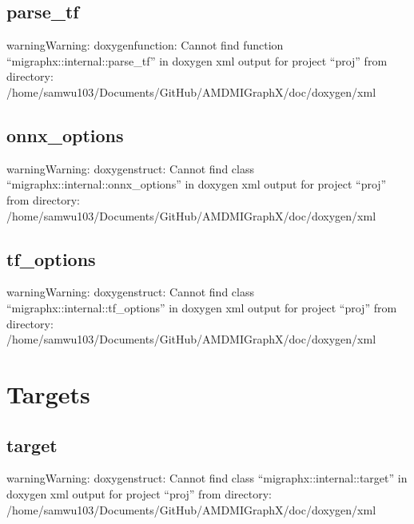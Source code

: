 \documentclass[letterpaper,10pt,english]{sphinxmanual}
\begin{document}
\subsection{parse\_tf}
\label{\detokenize{dev/program:parse-tf}}
\begin{sphinxadmonition}{warning}{Warning:}
\sphinxAtStartPar
doxygenfunction: Cannot find function “migraphx::internal::parse\_tf” in doxygen xml output for project “proj” from directory: /home/samwu103/Documents/GitHub/AMDMIGraphX/doc/doxygen/xml
\end{sphinxadmonition}


\subsection{onnx\_options}
\label{\detokenize{dev/program:onnx-options}}
\begin{sphinxadmonition}{warning}{Warning:}
\sphinxAtStartPar
doxygenstruct: Cannot find class “migraphx::internal::onnx\_options” in doxygen xml output for project “proj” from directory: /home/samwu103/Documents/GitHub/AMDMIGraphX/doc/doxygen/xml
\end{sphinxadmonition}


\subsection{tf\_options}
\label{\detokenize{dev/program:tf-options}}
\begin{sphinxadmonition}{warning}{Warning:}
\sphinxAtStartPar
doxygenstruct: Cannot find class “migraphx::internal::tf\_options” in doxygen xml output for project “proj” from directory: /home/samwu103/Documents/GitHub/AMDMIGraphX/doc/doxygen/xml
\end{sphinxadmonition}


\section{Targets}
\label{\detokenize{dev/targets:targets}}\label{\detokenize{dev/targets::doc}}

\subsection{target}
\label{\detokenize{dev/targets:target}}
\begin{sphinxadmonition}{warning}{Warning:}
\sphinxAtStartPar
doxygenstruct: Cannot find class “migraphx::internal::target” in doxygen xml output for project “proj” from directory: /home/samwu103/Documents/GitHub/AMDMIGraphX/doc/doxygen/xml
\end{sphinxadmonition}
\end{document}
